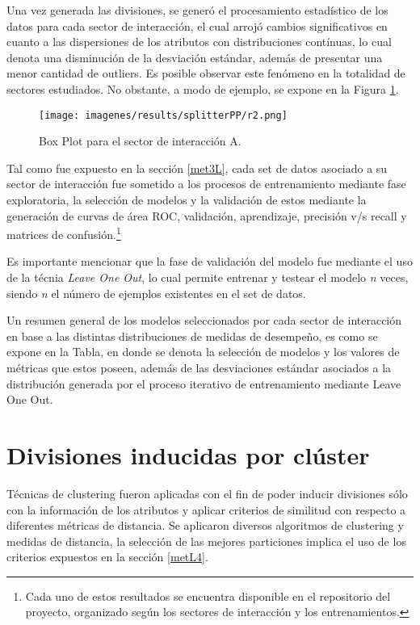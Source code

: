 Una vez generada las divisiones, se gener\'o el procesamiento estad\'istico de los datos para cada sector de interacci\'on, el cual arroj\'o cambios significativos en cuanto a las dispersiones de los atributos con distribuciones cont\'inuas, lo cual denota una disminuci\'on de la desviaci\'on est\'andar, adem\'as de presentar una menor cantidad de outliers. Es posible observar este fen\'omeno en la totalidad de sectores estudiados. No obstante, a modo de ejemplo, se expone en la Figura \ref{splitterPP2}.

\begin{figure}[!h]
	\centering
	\texttt{[image: imagenes/results/splitterPP/r2.png]}
	\caption{Box Plot para el sector de interacci\'on A.}
	\label{splitterPP2}
\end{figure}

Tal como fue expuesto en la secci\'on \ref{met3L}, cada set de datos asociado a su sector de interacci\'on fue sometido a los procesos de entrenamiento mediante fase exploratoria, la selecci\'on de modelos y la validaci\'on de estos mediante la generaci\'on de curvas de \'area ROC, validaci\'on, aprendizaje, precisi\'on v/s recall y matrices de confusi\'on.\footnote{Cada uno de estos resultados se encuentra disponible en el repositorio del proyecto, organizado seg\'un los sectores de interacci\'on y los entrenamientos.}

Es importante mencionar que la fase de validaci\'on del modelo fue mediante el uso de la t\'ecnia \textit{Leave One Out}, lo cual permite entrenar y testear el modelo \textit{n} veces, siendo \textit{n} el n\'umero de ejemplos existentes en el set de datos.

Un resumen general de los modelos seleccionados por cada sector de interacci\'on en base a las distintas distribuciones de medidas de desempe\~no, es como se expone en la Tabla, en donde se denota la selecci\'on de modelos y los valores de m\'etricas que estos poseen, adem\'as de las desviaciones est\'andar asociados a la distribuci\'on generada por el proceso iterativo de entrenamiento mediante Leave One Out.

\section{Divisiones inducidas por cl\'uster}

T\'ecnicas de clustering fueron aplicadas con el fin de poder inducir divisiones s\'olo con la informaci\'on de los atributos y aplicar criterios de similitud con respecto a diferentes m\'etricas de distancia. Se aplicaron diversos algoritmos de clustering y medidas de distancia, la selecci\'on de las mejores particiones implica el uso de los criterios expuestos en la secci\'on \ref{metL4}. 

